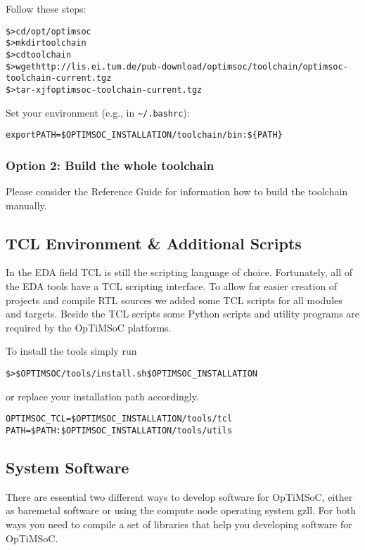Follow these steps:

\begin{alltt}
\$> cd /opt/optimsoc
\$> mkdir toolchain
\$> cd toolchain
\$> wget http://lis.ei.tum.de/pub-download/optimsoc/toolchain/optimsoc-toolchain-current.tgz
\$> tar -xjf optimsoc-toolchain-current.tgz
\end{alltt}

Set your environment (e.g., in \verb|~/.bashrc|):

\begin{alltt}
export PATH=\$OPTIMSOC_INSTALLATION/toolchain/bin:\$\{PATH\}
\end{alltt}

\subsubsection{Option 2: Build the whole toolchain}

Please consider the Reference Guide for information how to build the
toolchain manually.

\subsection{TCL Environment \& Additional Scripts}

In the EDA field TCL is still the scripting language of choice.
Fortunately, all of the EDA tools have a TCL scripting interface. To
allow for easier creation of projects and compile RTL sources we added
some TCL scripts for all modules and targets. Beside the TCL scripts
some Python scripts and utility programs are required by the OpTiMSoC
platforms.

To install the tools simply run

\begin{alltt}
\$> \$OPTIMSOC/tools/install.sh \$OPTIMSOC_INSTALLATION
\end{alltt}

or replace your installation path accordingly.

\begin{alltt}
OPTIMSOC_TCL=\$OPTIMSOC_INSTALLATION/tools/tcl
PATH=\$PATH:\$OPTIMSOC_INSTALLATION/tools/utils
\end{alltt}

\subsection{System Software}

There are essential two different ways to develop software for
OpTiMSoC, either as baremetal software or using the compute node
operating system gzll. For both ways you need to compile a set of
libraries that help you developing software for OpTiMSoC.

